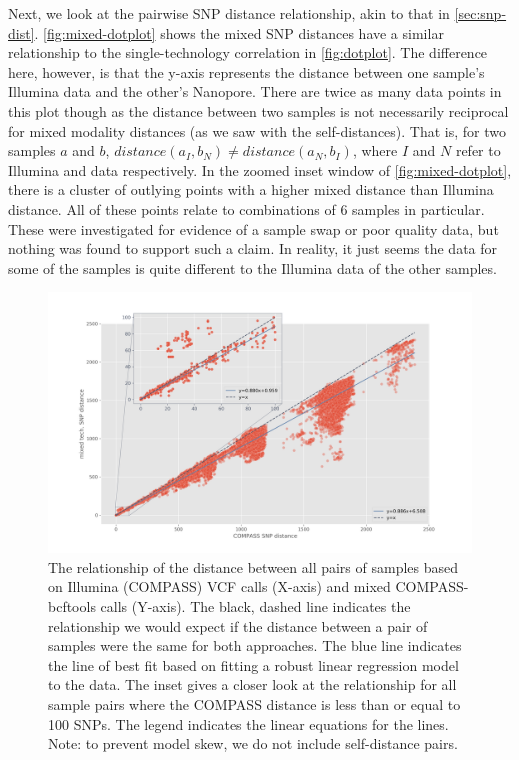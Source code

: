 Next, we look at the pairwise SNP distance relationship, akin to that in \autoref{sec:snp-dist}. \autoref{fig:mixed-dotplot} shows the mixed SNP distances have a similar relationship to
the single-technology correlation in \autoref{fig:dotplot}. The difference here, however, is that
the y-axis represents the distance between one sample's Illumina data
and the other's Nanopore. There are twice as many data points in this plot though as the distance between two samples is not necessarily reciprocal for mixed modality distances (as we saw with the self-distances). That is, for two samples $a$ and $b$, $distance(a_I,b_N) \neq distance(a_N, b_I)$, where $I$ and $N$ refer to Illumina and \ont{} data respectively. In the zoomed inset window of \autoref{fig:mixed-dotplot}, there is a cluster of outlying points with a higher mixed distance than Illumina distance. All of these points relate to combinations of 6 samples in particular. These were investigated for evidence of a sample swap or poor quality data, but nothing was found to support such a claim. In reality, it just seems the \ont{} data for some of the samples is quite different to the Illumina data of the other samples.

\begin{figure}
\begin{center}
\includegraphics[width=0.90\columnwidth]{Chapter2/Figs/mixed-dotplot.png}
\caption{{The relationship of the distance between all pairs of samples based on
Illumina (COMPASS) VCF calls (X-axis) and mixed COMPASS-bcftools calls (Y-axis).
The black, dashed line indicates the relationship we would expect if the
distance between a pair of samples were the same for both approaches.
The blue line indicates the line of best fit based on fitting a robust
linear regression model to the data. The inset gives a closer look at
the relationship for all sample pairs where the COMPASS distance is less
than or equal to 100 SNPs. The legend indicates the linear equations for
the lines. Note: to prevent model skew, we do not include self-distance
pairs.
{\label{fig:mixed-dotplot}}%
}}
\end{center}
\end{figure}


